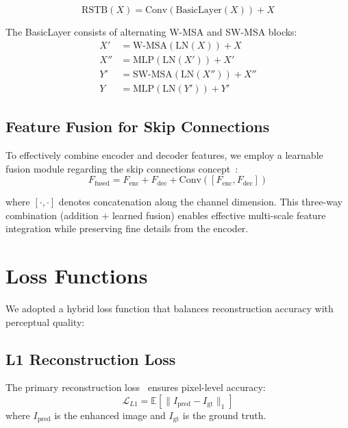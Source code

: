 \documentclass[conference]{IEEEtran}
\begin{document}
\begin{equation}
\text{RSTB}(X) = \text{Conv}(\text{BasicLayer}(X)) + X
\end{equation}

The BasicLayer consists of alternating W-MSA and SW-MSA blocks:
\begin{equation}
\begin{aligned}
X' &= \text{W-MSA}(\text{LN}(X)) + X \\
X'' &= \text{MLP}(\text{LN}(X')) + X' \\
Y' &= \text{SW-MSA}(\text{LN}(X'')) + X'' \\
Y &= \text{MLP}(\text{LN}(Y')) + Y'
\end{aligned}
\end{equation}

\subsection{Feature Fusion for Skip Connections}

To effectively combine encoder and decoder features, we employ a learnable fusion module regarding the skip connections concept~\cite{ronneberger2015unet}:
\begin{equation}
F_{\text{fused}} = F_{\text{enc}} + F_{\text{dec}} + \text{Conv}([F_{\text{enc}}, F_{\text{dec}}])
\end{equation}

where $[\cdot, \cdot]$ denotes concatenation along the channel dimension. This three-way combination (addition + learned fusion) enables effective multi-scale feature integration while preserving fine details from the encoder.

\section{Loss Functions}

We adopted a hybrid loss function that balances reconstruction accuracy with perceptual quality:

\subsection{L1 Reconstruction Loss}
The primary reconstruction loss~\cite{isola2016pix2pix} ensures pixel-level accuracy:
\begin{equation}
\mathcal{L}_{L1} = \mathbb{E}[\|I_{\text{pred}} - I_{\text{gt}}\|_1]
\end{equation}
where $I_{\text{pred}}$ is the enhanced image and $I_{\text{gt}}$ is the ground truth.
\end{document}
